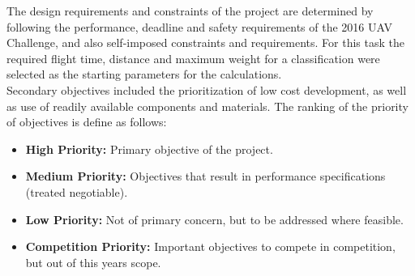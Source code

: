The design requirements and constraints of the project are determined by following the performance, deadline and safety requirements of the 2016 UAV Challenge, and also self-imposed constraints and requirements. For this task the required flight time, distance and maximum weight for a classification were selected as the starting parameters for the calculations.\\

Secondary objectives included the prioritization of low cost development, as well as use of readily available components and materials. The ranking of the priority of objectives is define as follows:

\begin{itemize}
	\item \textbf{High Priority:} Primary objective of the project.
	\item \textbf{Medium Priority:} Objectives that result in performance specifications (treated negotiable).
	\item \textbf{Low Priority:} Not of primary concern, but to be addressed where feasible.
	\item \textbf{Competition Priority:} Important objectives to compete in competition, but out of this years scope.
\end{itemize}

